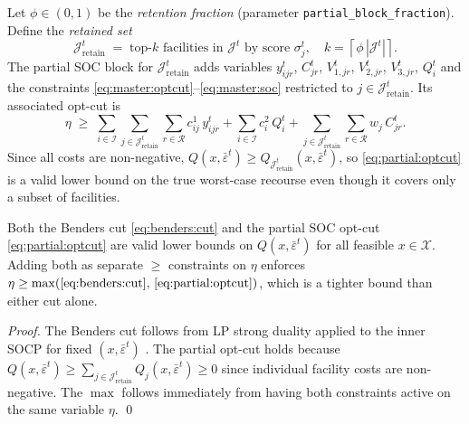Let $\phi \in (0,1)$ be the \emph{retention fraction} (parameter
\texttt{partial\_block\_fraction}).
Define the \emph{retained set}
\begin{equation}
  \mathcal{J}^t_{\mathrm{retain}}
  \;=\;
  \text{top-}k\text{ facilities in } \mathcal{J}^t
  \text{ by score } \sigma_j^t,
  \quad
  k = \left\lceil \phi\,|\mathcal{J}^t| \right\rceil.
  \label{eq:retain}
\end{equation}
The partial SOC block for $\mathcal{J}^t_{\mathrm{retain}}$ adds
variables $y^t_{ijr}$, $C^t_{jr}$, $V^t_{1,jr}$, $V^t_{2,jr}$,
$V^t_{3,jr}$, $Q^t_i$ and the constraints
\eqref{eq:master:optcut}--\eqref{eq:master:soc}
restricted to $j \in \mathcal{J}^t_{\mathrm{retain}}$.
Its associated opt-cut is
\begin{equation}
  \eta \;\ge\;
  \sum_{i\in\mathcal{I}}\sum_{j\in\mathcal{J}^t_{\mathrm{retain}}}\sum_{r\in\mathcal{R}}
    c^1_{ij}\,y^t_{ijr}
  + \sum_{i\in\mathcal{I}} c^2_i\,Q^t_i
  + \sum_{j\in\mathcal{J}^t_{\mathrm{retain}}}\sum_{r\in\mathcal{R}} w_j\,C^t_{jr}.
  \label{eq:partial:optcut}
\end{equation}
Since all costs are non-negative,
$Q(x,\bar\varepsilon^t) \ge Q_{\mathcal{J}^t_{\mathrm{retain}}}(x,\bar\varepsilon^t)$,
so \eqref{eq:partial:optcut} is a valid lower bound on the true
worst-case recourse even though it covers only a subset of facilities.

\begin{proposition}
\label{prop:validity}
Both the Benders cut \eqref{eq:benders:cut} and the partial SOC
opt-cut \eqref{eq:partial:optcut} are valid lower bounds on
$Q(x,\bar\varepsilon^t)$ for all feasible $x \in \mathcal{X}$.
Adding both as separate $\ge$ constraints on $\eta$ enforces
$\eta \ge \max\!\left(\eqref{eq:benders:cut},\,\eqref{eq:partial:optcut}\right)$,
which is a tighter bound than either cut alone.
\end{proposition}

\begin{proof}
The Benders cut follows from LP strong duality applied to the inner
SOCP for fixed $(x,\bar\varepsilon^t)$ \citep[Lemma~1]{ZengZhao2013}.
The partial opt-cut holds because
$Q(x,\bar\varepsilon^t) \ge \sum_{j\in\mathcal{J}^t_{\mathrm{retain}}} Q_j(x,\bar\varepsilon^t) \ge 0$
since individual facility costs are non-negative.
The $\max$ follows immediately from having both constraints active on
the same variable $\eta$. \qed
\end{proof}

